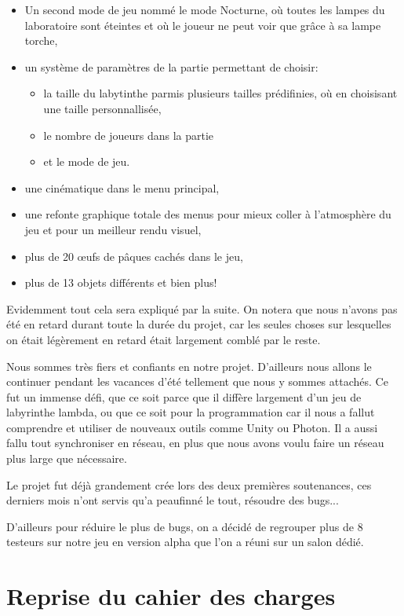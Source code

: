 \documentclass{article}
\begin{document}
\begin{itemize}
\item Un second mode de jeu nommé le mode Nocturne, où toutes les lampes du laboratoire sont éteintes et où le joueur ne peut voir que grâce à sa lampe torche,
\item un système de paramètres de la partie permettant de choisir:
\begin{itemize}
\item la taille du labytinthe parmis plusieurs tailles prédifinies, où en choisisant une taille personnallisée,
\item le nombre de joueurs dans la partie
\item et le mode de jeu.
\end{itemize}
\item une cinématique dans le menu principal,
\item une refonte graphique totale des menus pour mieux coller à l'atmosphère du jeu et pour un meilleur rendu visuel, 
\item plus de 20 œufs de pâques cachés dans le jeu,
\item plus de 13 objets différents et bien plus!
\end{itemize}

Evidemment tout cela sera expliqué par la suite. On notera que nous n'avons pas été en retard durant toute la durée du projet, car les seules choses sur lesquelles on était légèrement en retard était largement comblé par le reste.

Nous sommes très fiers et confiants en notre projet. D'ailleurs nous allons le continuer pendant les vacances d'été tellement que nous y sommes attachés. Ce fut un immense défi, que ce soit parce que il diffère largement d'un jeu de labyrinthe lambda, ou que ce soit pour la programmation car il nous a fallut comprendre et utiliser de nouveaux outils comme Unity ou Photon. Il a aussi fallu tout synchroniser en réseau, en plus que nous avons voulu faire un réseau plus large que nécessaire.

Le projet fut déjà grandement crée lors des deux premières soutenances, ces derniers mois n'ont servis qu'a peaufinné le tout, résoudre des bugs...

D'ailleurs pour réduire le plus de bugs, on a décidé de regrouper plus de 8 testeurs sur notre jeu en version alpha que l'on a réuni sur un salon dédié.

\newpage
\section{Reprise du cahier des charges}
\end{document}
